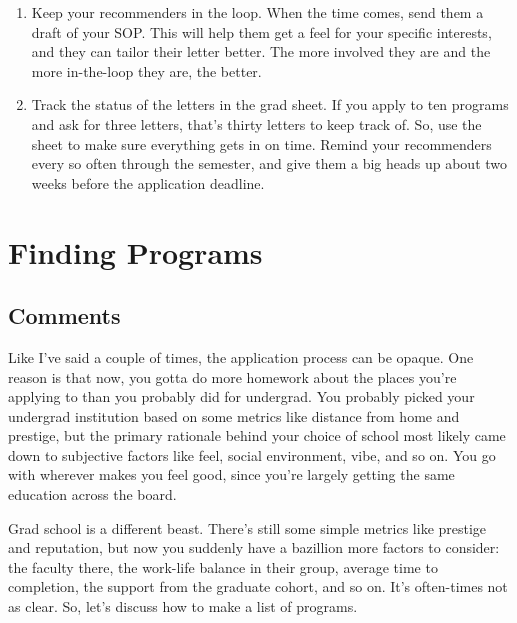 \documentclass[12pt]{article}
\begin{document}
\begin{enumerate}
\item Keep your recommenders in the loop. When the time comes, send them a draft of your SOP. This will help them get a feel for your specific interests, and they can tailor their letter better. The more involved they are and the more in-the-loop they are, the better. 

\item Track the status of the letters in the grad sheet. If you apply to ten programs and ask for three letters, that's thirty letters to keep track of. So, use the sheet to make sure everything gets in on time. Remind your recommenders every so often through the semester, and give them a big heads up about two weeks before the application deadline.
\end{enumerate}


\section{Finding Programs}
\subsection{Comments}
Like I've said a couple of times, the application process can be opaque. One reason is that now, you gotta do more homework about the places you're applying to than you probably did for undergrad. You probably picked your undergrad institution based on some metrics like distance from home and prestige, but the primary rationale behind your choice of school most likely came down to subjective factors like feel, social environment, vibe, and so on. You go with wherever makes you feel good, since you're largely getting the same education across the board.

Grad school is a different beast. There's still some simple metrics like prestige and reputation, but now you suddenly have a bazillion more factors to consider: the faculty there, the work-life balance in their group, average time to completion, the support from the graduate cohort, and so on. It's often-times not as clear. So, let's discuss how to make a list of programs.
\end{document}
